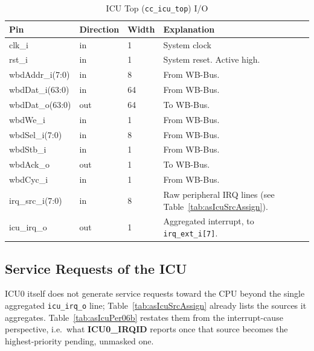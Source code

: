 \begin{table}[H]
\caption{ICU Top (\texttt{cc\_icu\_top}) I/O}
\label{tab:asIcuPer06}
\centering
\begin{tabularx}{\textwidth}{|l |l |l |X|}
  \hline
  Pin & Direction & Width & Explanation \\
  \hline
  \hline
  clk\_i & in & 1 & System clock \\
  \hline
  rst\_i & in & 1 & System reset. Active high. \\
  \hline
  wbdAddr\_i(7:0) & in & 8 & From WB-Bus. \\
  \hline
  wbdDat\_i(63:0) & in & 64 & From WB-Bus. \\
  \hline
  wbdDat\_o(63:0) & out & 64 & To WB-Bus. \\
  \hline
  wbdWe\_i & in & 1 & From WB-Bus. \\
  \hline
  wbdSel\_i(7:0) & in & 8 & From WB-Bus. \\
  \hline
  wbdStb\_i & in & 1 & From WB-Bus. \\
  \hline
  wbdAck\_o & out & 1 & To WB-Bus. \\
  \hline
  wbdCyc\_i & in & 1 & From WB-Bus. \\
  \hline
  irq\_src\_i(7:0) & in & 8 & Raw peripheral IRQ lines (see Table~\ref{tab:asIcuSrcAssign}). \\
  \hline
  icu\_irq\_o & out & 1 & Aggregated interrupt, to \texttt{irq\_ext\_i[7]}. \\
  \hline
\end{tabularx}
\end{table}

\subsection{Service Requests of the ICU}

ICU0 itself does not generate service requests toward the CPU beyond the
single aggregated \texttt{icu\_irq\_o} line; Table~\ref{tab:asIcuSrcAssign}
already lists the sources it aggregates. Table~\ref{tab:asIcuPer06b}
restates them from the interrupt-cause perspective, i.e.\ what
\textbf{ICU0\_IRQID} reports once that source becomes the
highest-priority pending, unmasked one.

